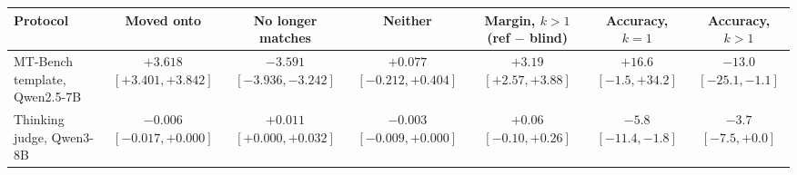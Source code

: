\begin{tabular}{lcccccc}
\toprule
Protocol & Moved onto & No longer matches & Neither & Margin, $k{>}1$ (ref $-$ blind) & Accuracy, $k{=}1$ & Accuracy, $k{>}1$ \\
\midrule
MT-Bench template, Qwen2.5-7B & $+3.618$ {\scriptsize$[+3.401,+3.842]$} & $-3.591$ {\scriptsize$[-3.936,-3.242]$} & $+0.077$ {\scriptsize$[-0.212,+0.404]$} & $+3.19$ {\scriptsize$[+2.57,+3.88]$} & $+16.6$ {\scriptsize$[-1.5,+34.2]$} & $-13.0$ {\scriptsize$[-25.1,-1.1]$} \\
Thinking judge, Qwen3-8B & $-0.006$ {\scriptsize$[-0.017,+0.000]$} & $+0.011$ {\scriptsize$[+0.000,+0.032]$} & $-0.003$ {\scriptsize$[-0.009,+0.000]$} & $+0.06$ {\scriptsize$[-0.10,+0.26]$} & $-5.8$ {\scriptsize$[-11.4,-1.8]$} & $-3.7$ {\scriptsize$[-7.5,+0.0]$} \\
\bottomrule
\end{tabular}
